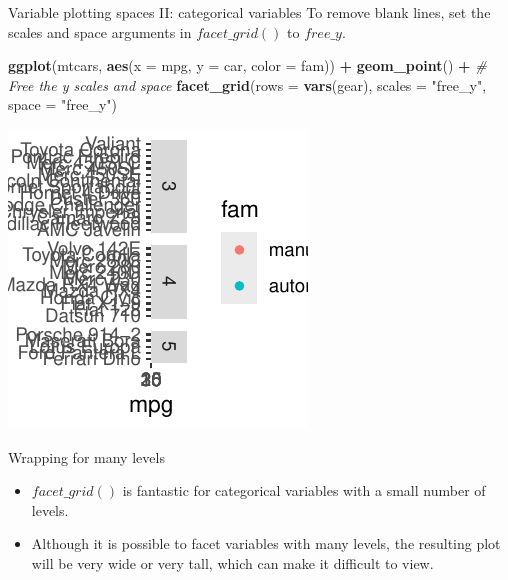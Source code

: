 \documentclass[
  ignorenonframetext,
]{beamer}
\newenvironment{Shaded}{\begin{snugshade}}{\end{snugshade}}
\newcommand{\AttributeTok}[1]{\textcolor[rgb]{0.13,0.29,0.53}{#1}}
\newcommand{\CommentTok}[1]{\textcolor[rgb]{0.56,0.35,0.01}{\textit{#1}}}
\newcommand{\FunctionTok}[1]{\textcolor[rgb]{0.13,0.29,0.53}{\textbf{#1}}}
\newcommand{\NormalTok}[1]{#1}
\newcommand{\SpecialCharTok}[1]{\textcolor[rgb]{0.81,0.36,0.00}{\textbf{#1}}}
\newcommand{\StringTok}[1]{\textcolor[rgb]{0.31,0.60,0.02}{#1}}
\begin{document}
\begin{frame}[fragile]{Variable plotting spaces II: categorical
variables}
\label{variable-plotting-spaces-ii-categorical-variables-3}
To remove blank lines, set the scales and space arguments in
\(facet\_grid()\) to \(free\_y\).


\begin{Shaded}
\begin{Highlighting}[]
\FunctionTok{ggplot}\NormalTok{(mtcars, }\FunctionTok{aes}\NormalTok{(}\AttributeTok{x =}\NormalTok{ mpg, }\AttributeTok{y =}\NormalTok{ car, }\AttributeTok{color =}\NormalTok{ fam)) }\SpecialCharTok{+} \FunctionTok{geom\_point}\NormalTok{() }\SpecialCharTok{+}
    \CommentTok{\# Free the y scales and space}
\FunctionTok{facet\_grid}\NormalTok{(}\AttributeTok{rows =} \FunctionTok{vars}\NormalTok{(gear), }\AttributeTok{scales =} \StringTok{"free\_y"}\NormalTok{, }\AttributeTok{space =} \StringTok{"free\_y"}\NormalTok{)}
\end{Highlighting}
\end{Shaded}

\begin{center}\includegraphics[width=0.5\linewidth]{Figs/unnamed-chunk-92-1} \end{center}
\end{frame}

\begin{frame}{Wrapping for many levels}
\label{wrapping-for-many-levels}
\begin{itemize}
\item
  \(facet\_grid()\) is fantastic for categorical variables with a small
  number of levels.
\item
  Although it is possible to facet variables with many levels, the
  resulting plot will be very wide or very tall, which can make it
  difficult to view.
\end{itemize}
\end{frame}
\end{document}
